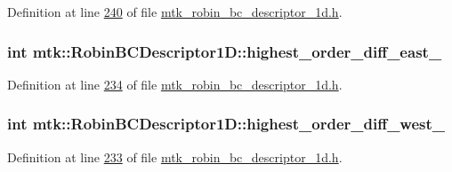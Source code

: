 Definition at line \hyperlink{mtk__robin__bc__descriptor__1d_8h_source_l00240}{240} of file \hyperlink{mtk__robin__bc__descriptor__1d_8h_source}{mtk\+\_\+robin\+\_\+bc\+\_\+descriptor\+\_\+1d.\+h}.

\hypertarget{classmtk_1_1RobinBCDescriptor1D_a7a1e3660c59b132ddf576c36adf7dd37}{
\subsubsection[{highest\+\_\+order\+\_\+diff\+\_\+east\+\_\+}]{\setlength{\rightskip}{0pt plus 5cm}int mtk\+::\+Robin\+B\+C\+Descriptor1\+D\+::highest\+\_\+order\+\_\+diff\+\_\+east\+\_\+\hspace{0.3cm}{\ttfamily [private]}}}\label{classmtk_1_1RobinBCDescriptor1D_a7a1e3660c59b132ddf576c36adf7dd37}


Definition at line \hyperlink{mtk__robin__bc__descriptor__1d_8h_source_l00234}{234} of file \hyperlink{mtk__robin__bc__descriptor__1d_8h_source}{mtk\+\_\+robin\+\_\+bc\+\_\+descriptor\+\_\+1d.\+h}.

\hypertarget{classmtk_1_1RobinBCDescriptor1D_ab8d5accf2e2c2fae79865a5b8d11c3c5}{
\subsubsection[{highest\+\_\+order\+\_\+diff\+\_\+west\+\_\+}]{\setlength{\rightskip}{0pt plus 5cm}int mtk\+::\+Robin\+B\+C\+Descriptor1\+D\+::highest\+\_\+order\+\_\+diff\+\_\+west\+\_\+\hspace{0.3cm}{\ttfamily [private]}}}\label{classmtk_1_1RobinBCDescriptor1D_ab8d5accf2e2c2fae79865a5b8d11c3c5}


Definition at line \hyperlink{mtk__robin__bc__descriptor__1d_8h_source_l00233}{233} of file \hyperlink{mtk__robin__bc__descriptor__1d_8h_source}{mtk\+\_\+robin\+\_\+bc\+\_\+descriptor\+\_\+1d.\+h}.

